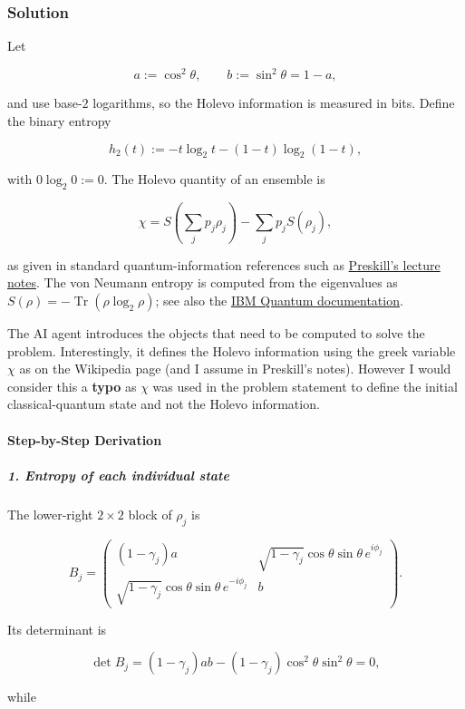 \subsubsection*{Solution}
Let

\[
a:=\cos ^2\theta,\qquad b:=\sin ^2\theta=1-a,
\]

and use base-$2$ logarithms, so the Holevo information is measured in bits. Define the binary entropy

\[
h_2(t):=-t\log_2t-(1-t)\log_2(1-t),
\]

with $0\log_2 0:=0$. The Holevo quantity of an ensemble is

\[
\chi=S\left(\sum_jp_j\rho_j\right)-\sum_jp_jS(\rho_j),
\]

as given in standard quantum-information references such as \href{\detokenize{https://www.preskill.caltech.edu/ph229/notes/chap5.pdf}}{Preskill's lecture notes}. The von Neumann entropy is computed from the eigenvalues as $S(\rho)=-\operatorname{Tr}(\rho\log_2\rho)$; see also the \href{\detokenize{https://quantum.cloud.ibm.com/docs/api/qiskit/0.45/quantum_info}}{IBM Quantum documentation}.

{
\color{blue}
The AI agent introduces the objects that need to be computed to solve the problem. Interestingly, it defines the Holevo information using the greek variable $\chi$ as on the Wikipedia page (and I assume in Preskill's notes). However I would consider this a \textbf{typo} as $\chi$ was used in the problem statement to define the initial classical-quantum state and not the Holevo information. 

}

\paragraph*{Step-by-Step Derivation}

\subparagraph*{1. Entropy of each individual state}

The lower-right $2\times2$ block of $\rho_j$ is

\[
B_j=
\begin{pmatrix}
(1-\gamma_j)a &
\sqrt{1-\gamma_j}\cos\theta\sin\theta\,e^{i\phi_j}\\
\sqrt{1-\gamma_j}\cos\theta\sin\theta\,e^{-i\phi_j}&b
\end{pmatrix}.
\]

Its determinant is

\[
\det B_j =(1-\gamma_j)ab -(1-\gamma_j)\cos^2\theta\sin^2\theta =0,
\]

while

